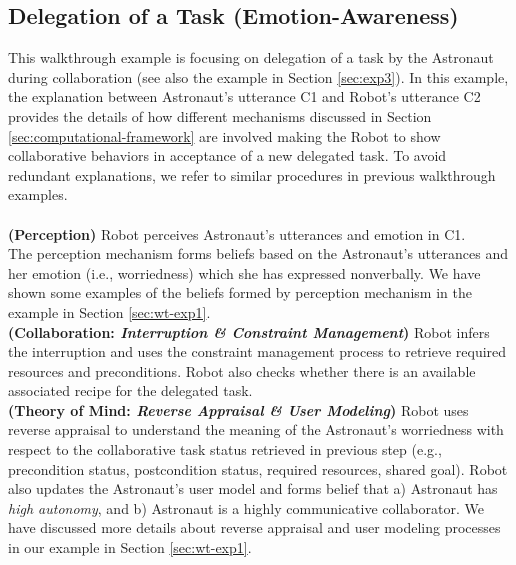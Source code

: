 \subsection{Delegation of a Task (Emotion-Awareness)}
\label{sec:wt-exp3}

This walkthrough example is focusing on delegation of a task by the Astronaut
during collaboration (see also the example in Section \ref{sec:exp3}). In this
example, the explanation between Astronaut's utterance C1 and Robot's utterance
C2 provides the details of how different mechanisms discussed in Section
\ref{sec:computational-framework} are involved making the Robot to show
collaborative behaviors in acceptance of a new delegated task. To avoid
redundant explanations, we refer to similar procedures in previous walkthrough
examples.\\

\noindent{}\\

\noindent\textbf{(Perception)} Robot perceives Astronaut's utterances and
emotion in C1.\\

The perception mechanism forms beliefs based on the Astronaut's utterances and
her emotion (i.e., worriedness) which she has expressed nonverbally. We have
shown some examples of the beliefs formed by perception mechanism in the example
in Section \ref{sec:wt-exp1}.\\

\noindent\textbf{(Collaboration: \textit{Interruption \& Constraint
Management})} Robot infers the interruption and uses the constraint management
process to retrieve required resources and preconditions. Robot also checks
whether there is an available associated recipe for the delegated task.\\

\noindent\textbf{(Theory of Mind: \textit{Reverse Appraisal \& User Modeling})}
Robot uses reverse appraisal to understand the meaning of the Astronaut's
worriedness with respect to the collaborative task status retrieved in previous
step (e.g., precondition status, postcondition status, required resources,
shared goal). Robot also updates the Astronaut's user model and forms belief
that a) Astronaut has \textit{high autonomy}, and b) Astronaut is a highly
communicative collaborator. We have discussed more details about reverse
appraisal and user modeling processes in our example in Section
\ref{sec:wt-exp1}.\\


